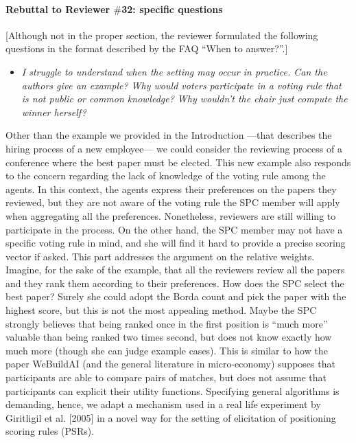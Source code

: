 \documentclass{article}
\begin{document}
\paragraph{Rebuttal to Reviewer $\#$32: specific questions}
[Although not in the proper section, the reviewer formulated the following questions in the format described by the FAQ “When to answer?”.]
\begin{itemize}
	\item \textit{I struggle to understand when the setting may occur in practice. Can the authors give an example? Why would voters participate in a voting rule that is not public or common knowledge? Why wouldn't the chair just compute the winner herself?}
\end{itemize}
Other than the example we provided in the Introduction —that describes the hiring process of a new employee— we could consider the reviewing process of a conference where the best paper must be elected. This new example also responds to the concern regarding the lack of knowledge of the voting rule among the agents. In this context, the agents express their preferences on the papers they reviewed, but they are not aware of the voting rule the SPC member will apply when aggregating all the preferences. Nonetheless, reviewers are still willing to participate in the process. On the other hand, the SPC member may not have a specific voting rule in mind, and she will find it hard to provide a precise scoring vector if asked. This part addresses the argument on the relative weights. Imagine, for the sake of the example, that all the reviewers review all the papers and they rank them according to their preferences. How does the SPC select the best paper? Surely she could adopt the Borda count and pick the paper with the highest score, but this is not the most appealing method. Maybe the SPC strongly believes that being ranked once in the first position is “much more” valuable than being ranked two times second, but does not know exactly how much more (though she can judge example cases). This is similar to how the paper WeBuildAI (and the general literature in micro-economy) supposes that participants are able to compare pairs of matches, but does not assume that participants can explicit their utility functions. Specifying general algorithms is demanding, hence, we adapt a mechanism used in a real life experiment by Giritligil et al. [2005] in a novel way for the setting of elicitation of positioning scoring rules (PSRs). 
\end{document}
